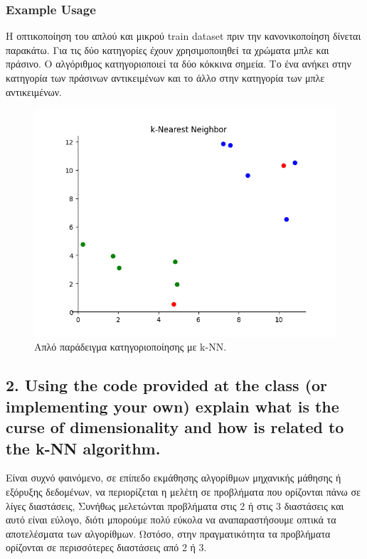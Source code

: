 \documentclass[12pt]{article}
\newenvironment{matlab}
	{\begin{figure}[H]\centering\captionsetup{justification=centering}}
	{\end{figure}}
\begin{document}
\subsubsection*{Example Usage}

Η οπτικοποίηση του απλού και μικρού train dataset πριν την κανονικοποίηση δίνεται παρακάτω. Για τις δύο κατηγορίες έχουν χρησιμοποιηθεί τα χρώματα μπλε και πράσινο. Ο αλγόριθμος κατηγοριοποιεί τα δύο κόκκινα σημεία. Το ένα ανήκει στην κατηγορία των πράσινων αντικειμένων και το άλλο στην κατηγορία των μπλε αντικειμένων. \\

\begin{matlab}
	\includegraphics[scale=0.8]{images/exercise1.png}
	\caption{Απλό παράδειγμα κατηγοριοποίησης με k-NN.}
\end{matlab}

\pagebreak

\subsection*{2. Using the code provided at the class (or implementing your own) explain what
	is the curse of dimensionality and how is related to the k-NN algorithm.}

Είναι συχνό φαινόμενο, σε επίπεδο εκμάθησης αλγορίθμων μηχανικής μάθησης ή εξόρυξης δεδομένων, να περιορίζεται η μελέτη σε προβλήματα που ορίζονται πάνω σε λίγες διαστάσεις, Συνήθως μελετώνται προβλήματα στις 2 ή στις 3 διαστάσεις και αυτό είναι εύλογο, διότι μπορούμε πολύ εύκολα να αναπαραστήσουμε οπτικά τα αποτελέσματα των αλγορίθμων. Ωστόσο, στην πραγματικότητα τα προβλήματα ορίζονται σε περισσότερες διαστάσεις από 2 ή 3. \\
\end{document}
